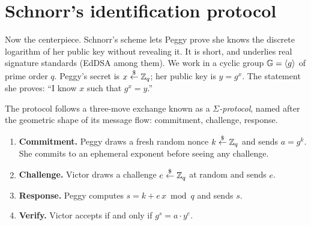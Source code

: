 \section{Schnorr's identification protocol}
\label{ch31:schnorr}

Now the centerpiece. Schnorr's scheme lets Peggy prove she knows the discrete
logarithm of her public key without revealing it. It is short, and
underlies real signature standards (EdDSA among them). We work in a cyclic group
$\mathbb{G} = \langle g \rangle$ of prime order $q$. Peggy's secret is $x \stackrel{\$}{\gets} \mathbb{Z}_q$;
her public key is $y = g^x$. The statement she proves: ``I know $x$ such that
$g^x = y$.''

The protocol follows a three-move exchange known as a \emph{$\Sigma$-protocol},
named after the geometric shape of its message flow: commitment, challenge, response.

\begin{enumerate}
  \item \textbf{Commitment.} Peggy draws a fresh random nonce $k \stackrel{\$}{\gets} \mathbb{Z}_q$ and sends
  $a = g^{k}$. She commits to an ephemeral exponent before seeing any challenge.
  \item \textbf{Challenge.} Victor draws a challenge $e \stackrel{\$}{\gets} \mathbb{Z}_q$ at random and sends $e$.
  \item \textbf{Response.} Peggy computes $s = k + e\,x \bmod q$ and sends $s$.
  \item \textbf{Verify.} Victor accepts if and only if $g^{s} = a \cdot y^{e}$.
\end{enumerate}

